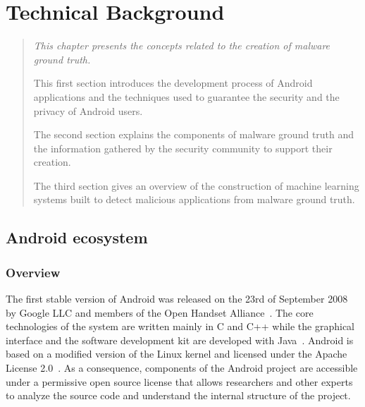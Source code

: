\chapter{Technical Background}
\label{chapter:background}

\begin{quote}
{\itshape
This chapter presents the concepts related to the creation of malware ground truth.

This first section introduces the development process of Android applications and the techniques used to guarantee the security and the privacy of Android users.

The second section explains the components of malware ground truth and the information gathered by the security community to support their creation.

The third section gives an overview of the construction of machine learning systems built to detect malicious applications from malware ground truth.
}
\end{quote}

\localtableofcontents{}

\section{Android ecosystem}
\subsection{Overview}
The first stable version of Android was released on the 23rd of September 2008 by Google LLC and members of the Open Handset Alliance~\cite{android_developers_announcing_2008}.
The core technologies of the system are written mainly in C and C++ while the graphical interface and the software development kit are developed with Java~\cite{open_hub_android_2019}.
Android is based on a modified version of the Linux kernel and licensed under the Apache License 2.0~\cite{android_android_2019-1}.
As a consequence, components of the Android project are accessible under a permissive open source license that allows researchers and other experts to analyze the source code and understand the internal structure of the project. 

